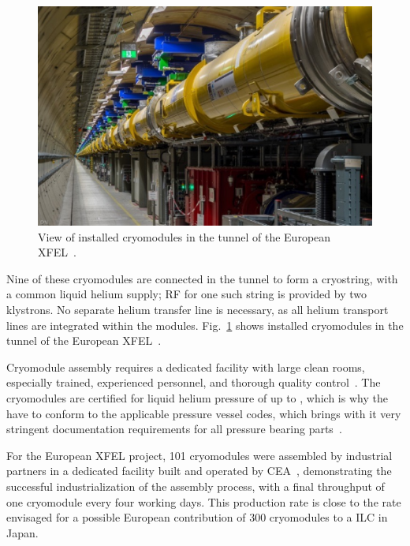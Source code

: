 \begin{figure}[htbp]
   \includegraphics[width=\hsize]{chapters/figures/srf17-moxa02-fig1}
\caption{View of installed cryomodules in the tunnel of the European XFEL~\cite{Reschke:2018ywk}.
}
\label{fig:xfel-tunnel}
\end{figure}


Nine of these cryomodules are connected in the tunnel to form a cryostring, with a common liquid helium supply; RF for one such string is provided by two klystrons.
No separate helium transfer line is necessary, as all helium transport lines are integrated within the modules.
Fig.~\ref{fig:xfel-tunnel} shows installed cryomodules in the tunnel of the European XFEL~\cite{Reschke:2018ywk}.

Cryomodule assembly requires a dedicated facility with large clean rooms, especially trained, experienced personnel, and thorough quality control~\cite{Berry:2017gpt}.
The cryomodules are certified for liquid helium pressure of up to , which is why the have to conform to the applicable pressure vessel codes, which brings with it very stringent documentation requirements for all pressure bearing parts~\cite{Peterson:2011zz}.

For the European XFEL project, 101 cryomodules were assembled by industrial partners in a dedicated facility built and operated by CEA~\cite{Weise:2014zqa,Berry:2017gpt}, demonstrating the successful industrialization of the assembly process, with a final throughput of one cryomodule every four working days.
This production rate is close to the rate envisaged for a possible European contribution of 300 cryomodules to a  ILC in Japan.

